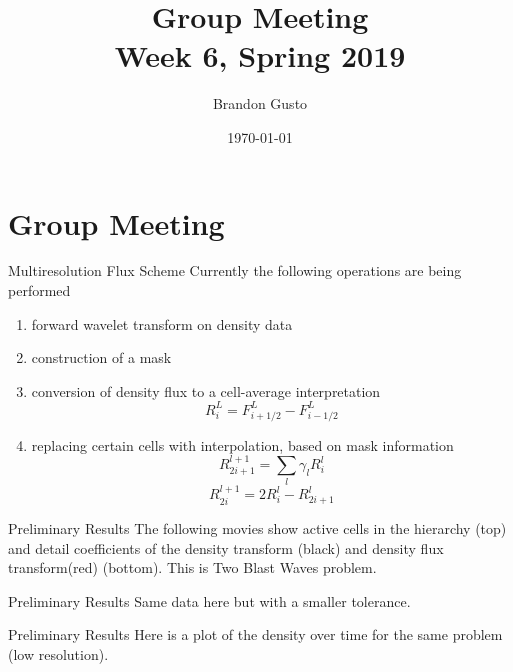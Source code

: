 \documentclass{beamer}
\begin{document}
\section{Group Meeting}
\title{Group Meeting \\ Week 6, Spring 2019}
\author{Brandon Gusto} %
\date{\today}
\frame{\titlepage}

\begin{frame}{Multiresolution Flux Scheme}
  Currently the following operations are being performed
  \begin{enumerate}
    \item<2-> forward wavelet transform on density data
    \item<3-> construction of a mask
    \item<4-> conversion of density flux to a cell-average interpretation
      \[ R_{i}^{L} = F_{i+1/2}^{L} - F_{i-1/2}^{L} \]
    \item<5-> replacing certain cells with interpolation, based on mask information
      \[ R_{2i+1}^{l+1} = \sum_{l} \gamma_{l} R_{i}^{l} \]
      \[ R_{2i}^{l+1} = 2 R_{i}^{l} - R_{2i+1}^{l} \]
  \end{enumerate}
\end{frame}


\begin{frame}{Preliminary Results}
  The following movies show active cells in the hierarchy (top) and detail coefficients of the
  density transform (black) and density flux transform(red) (bottom). This is
  Two Blast Waves problem.
  \begin{figure}
    \center
  \end{figure}
\end{frame}

\begin{frame}{Preliminary Results}
    Same data here but with a smaller tolerance.
  \begin{figure}
    \center
  \end{figure}
\end{frame}

\begin{frame}{Preliminary Results}
    Here is a plot of the density over time for the same problem (low
    resolution).
  \begin{figure}
    \center
  \end{figure}
\end{frame}
\end{document}
